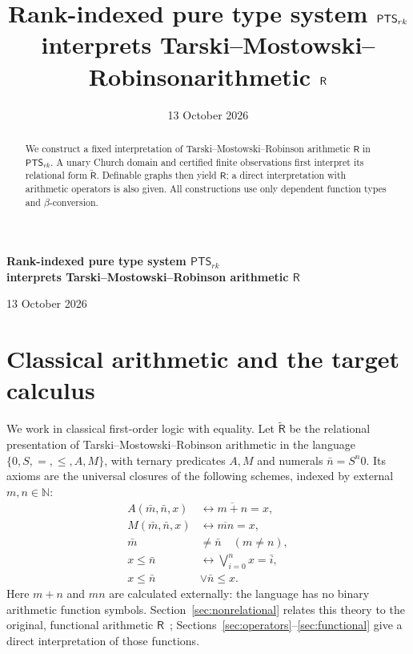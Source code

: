 \documentclass[11pt,a4paper]{article}
\title{\bfseries Rank-indexed pure type system $\PTS$\newline
interprets Tarski--Mostowski--Robinson\newline arithmetic $\R$}
\author{}\date{13 October 2026}
\newcommand{\PTS}{\mathsf{PTS}_{rk}}
\newcommand{\Rt}{\widetilde{\mathsf R}}
\newcommand{\R}{\mathsf R}
\theoremstyle{remark}\newtheorem*{remark}{Remark}
\begin{document}
\begin{center}
{\Large\bfseries Rank-indexed pure type system $\PTS$\\[3pt]
interprets Tarski--Mostowski--Robinson arithmetic $\R$\par}
\vspace{8pt}
13 October 2026
\end{center}
\vspace{-0.3em}
\begin{abstract}
We construct a fixed interpretation of Tarski--Mostowski--Robinson
arithmetic $\R$ in $\PTS$. A unary Church domain and certified finite observations
first interpret its relational form $\Rt$. Definable graphs then yield
$\R$; a direct interpretation with arithmetic operators is also given.
All constructions use only dependent function types and $\beta$-conversion.
\end{abstract}
\setlength{\abovedisplayskip}{8pt plus 2pt minus 2pt}
\setlength{\belowdisplayskip}{8pt plus 2pt minus 2pt}

\section{Classical arithmetic and the target calculus}\label{sec:logic}
We work in classical first-order logic with equality. Let $\Rt$ be the
relational presentation of Tarski--Mostowski--Robinson arithmetic in the
language $\{0,S,=,\le,A,M\}$, with ternary predicates $A,M$ and numerals
$\bar n=S^n0$. Its axioms are the universal closures of the following schemes,
indexed by external $m,n\in\mathbb N$:
\begin{align}
 A(\bar m,\bar n,x)&\leftrightarrow \overline{m+n}=x,
    \tag{$\widetilde R1$}\label{rtilde:add}\\
 M(\bar m,\bar n,x)&\leftrightarrow \overline{mn}=x,
    \tag{$\widetilde R2$}\label{rtilde:mul}\\
 \bar m&\ne\bar n\quad(m\ne n),
    \tag{$\widetilde R3$}\label{rtilde:neq}\\
 x\le\bar n&\leftrightarrow\bigvee_{i=0}^{n}x=\bar i,
    \tag{$\widetilde R4$}\label{rtilde:bound}\\
 x\le\bar n&\lor\bar n\le x.
    \tag{$\widetilde R5$}\label{rtilde:compare}
\end{align}
Here $m+n$ and $mn$ are calculated externally: the language has no binary
arithmetic function symbols. Section~\ref{sec:nonrelational} relates this theory
to the original, functional arithmetic $\R$~\cite{tmr};
Sections~\ref{sec:operators}--\ref{sec:functional} give a direct interpretation
of those functions.
\end{document}
